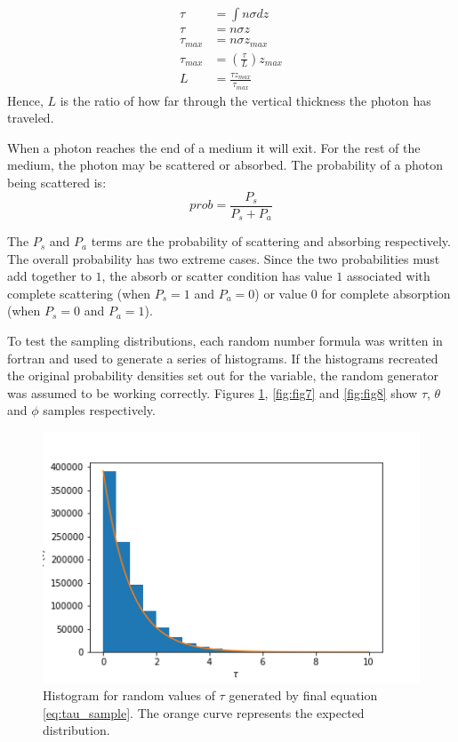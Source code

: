 \documentclass[twocolumn]{article}
\begin{document}
\begin{equation}
\begin{split}
\tau &= \int n \sigma dz \\
\tau &= n \sigma z\\
\tau_{max} &= n \sigma z_{max} \\
\tau_{max} &= (\frac{\tau}{L}) z_{max} \\
L &= \frac{\tau z_{max}}{\tau_{max}}
\end{split}
\end{equation}
Hence, $L$ is the ratio of how far through the vertical thickness the photon has traveled.

When a photon reaches the end of a medium it will exit. For the rest of the medium, the photon may be scattered or absorbed. The probability of a photon being scattered is:
\begin{equation}
prob = \frac{P_s}{P_s + P_a}
\end{equation}

The $P_s$ and $P_a$ terms are the probability of scattering and absorbing respectively. The overall probability has two extreme cases. Since the two probabilities must add together to $1$, the absorb or scatter condition has value $1$ associated with complete scattering (when $P_s = 1$ and $P_a=0$) or value $0$ for complete absorption (when $P_s = 0$ and $P_a=1$).

To test the sampling distributions, each random number formula was written in fortran and used to generate a series of histograms. If the histograms recreated the original probability densities set out for the variable, the random generator was assumed to be working correctly. Figures \ref{fig:fig6}, \ref{fig:fig7} and \ref{fig:fig8} show $\tau$, $\theta$ and $\phi$ samples respectively.

\begin{figure}[t]
\centering
\includegraphics[width=\linewidth]{fig6}
\caption{Histogram for random values of $\tau$ generated by final equation \ref{eq:tau_sample}. The orange curve represents the expected distribution.}
\label{fig:fig6}
\end{figure}
\end{document}
